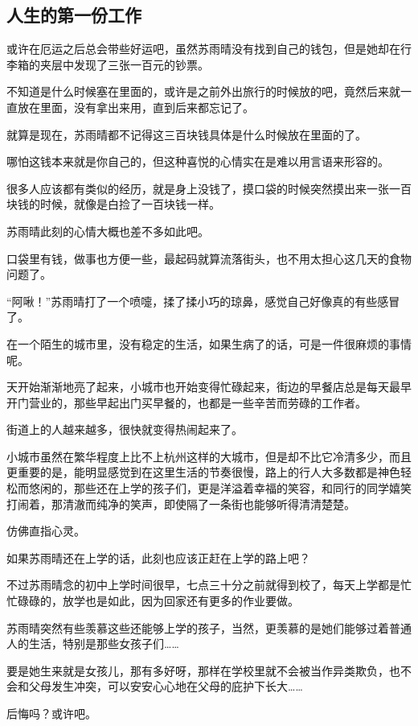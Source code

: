 \subsection{人生的第一份工作}

或许在厄运之后总会带些好运吧，虽然苏雨晴没有找到自己的钱包，但是她却在行李箱的夹层中发现了三张一百元的钞票。

不知道是什么时候塞在里面的，或许是之前外出旅行的时候放的吧，竟然后来就一直放在里面，没有拿出来用，直到后来都忘记了。

就算是现在，苏雨晴都不记得这三百块钱具体是什么时候放在里面的了。

哪怕这钱本来就是你自己的，但这种喜悦的心情实在是难以用言语来形容的。

很多人应该都有类似的经历，就是身上没钱了，摸口袋的时候突然摸出来一张一百块钱的时候，就像是白捡了一百块钱一样。

苏雨晴此刻的心情大概也差不多如此吧。

口袋里有钱，做事也方便一些，最起码就算流落街头，也不用太担心这几天的食物问题了。

“阿啾！”苏雨晴打了一个喷嚏，揉了揉小巧的琼鼻，感觉自己好像真的有些感冒了。

在一个陌生的城市里，没有稳定的生活，如果生病了的话，可是一件很麻烦的事情呢。

天开始渐渐地亮了起来，小城市也开始变得忙碌起来，街边的早餐店总是每天最早开门营业的，那些早起出门买早餐的，也都是一些辛苦而劳碌的工作者。

街道上的人越来越多，很快就变得热闹起来了。

小城市虽然在繁华程度上比不上杭州这样的大城市，但是却不比它冷清多少，而且更重要的是，能明显感觉到在这里生活的节奏很慢，路上的行人大多数都是神色轻松而悠闲的，那些还在上学的孩子们，更是洋溢着幸福的笑容，和同行的同学嬉笑打闹着，那清澈而纯净的笑声，即使隔了一条街也能够听得清清楚楚。

仿佛直指心灵。

如果苏雨晴还在上学的话，此刻也应该正赶在上学的路上吧？

不过苏雨晴念的初中上学时间很早，七点三十分之前就得到校了，每天上学都是忙忙碌碌的，放学也是如此，因为回家还有更多的作业要做。

苏雨晴突然有些羡慕这些还能够上学的孩子，当然，更羡慕的是她们能够过着普通人的生活，特别是那些女孩子们……

要是她生来就是女孩儿，那有多好呀，那样在学校里就不会被当作异类欺负，也不会和父母发生冲突，可以安安心心地在父母的庇护下长大……

后悔吗？或许吧。


